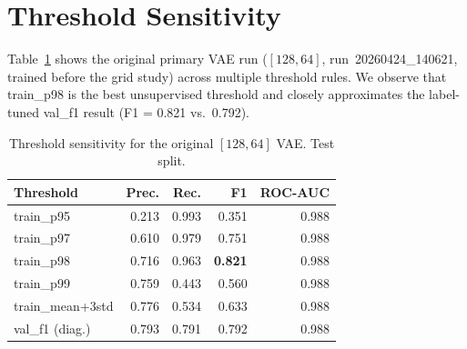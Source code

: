\documentclass{article}
\newcommand{\hcell}[1]{\textbf{\textcolor{accent!90!black}{#1}}}
\begin{document}
\section{Threshold Sensitivity}
\label{app:thresholds}

Table~\ref{tab:thresh} shows the original primary VAE run ($[128, 64]$,
run~20260424\_140621, trained before the grid study) across multiple threshold rules.
We observe that train\_p98 is the best unsupervised threshold and closely approximates
the label-tuned val\_f1 result (F1 = 0.821 vs.\ 0.792).

\begin{table}[h]
\centering
\small
\caption{Threshold sensitivity for the original $[128, 64]$ VAE. Test split.}
\label{tab:thresh}
\vspace{3pt}
\begin{tabular}{l r r r r}
\toprule
\rowcolor{tabhead}
\hcell{Threshold} & \hcell{Prec.} & \hcell{Rec.} & \hcell{F1} & \hcell{ROC-AUC} \\
\midrule
train\_p95         & 0.213 & 0.993 & 0.351 & 0.988 \\
\rowcolor{tabalt}
train\_p97         & 0.610 & 0.979 & 0.751 & 0.988 \\
train\_p98         & 0.716 & 0.963 & \textbf{0.821} & 0.988 \\
\rowcolor{tabalt}
train\_p99         & 0.759 & 0.443 & 0.560 & 0.988 \\
train\_mean+3std   & 0.776 & 0.534 & 0.633 & 0.988 \\
\rowcolor{tabalt}
val\_f1 (diag.)    & 0.793 & 0.791 & 0.792 & 0.988 \\
\bottomrule
\end{tabular}
\end{table}
\end{document}
